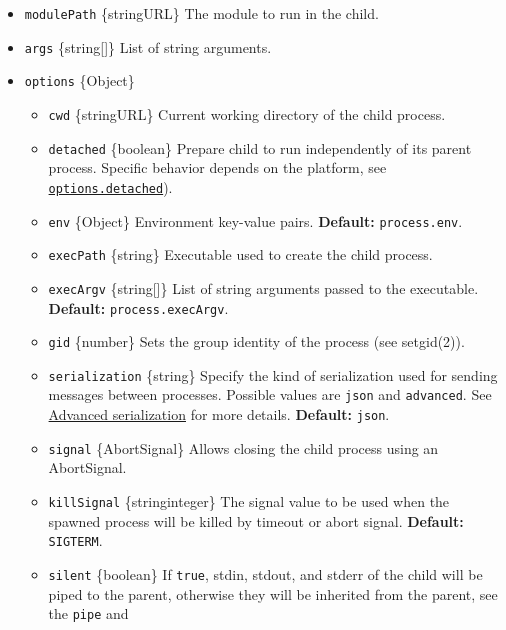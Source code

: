 \begin{itemize}
\tightlist
\item
  \texttt{modulePath} \{string\textbar URL\} The module to run in the
  child.
\item
  \texttt{args} \{string{[}{]}\} List of string arguments.
\item
  \texttt{options} \{Object\}

  \begin{itemize}
  \tightlist
  \item
    \texttt{cwd} \{string\textbar URL\} Current working directory of the
    child process.
  \item
    \texttt{detached} \{boolean\} Prepare child to run independently of
    its parent process. Specific behavior depends on the platform, see
    \hyperref[optionsdetached]{\texttt{options.detached}}).
  \item
    \texttt{env} \{Object\} Environment key-value pairs.
    \textbf{Default:} \texttt{process.env}.
  \item
    \texttt{execPath} \{string\} Executable used to create the child
    process.
  \item
    \texttt{execArgv} \{string{[}{]}\} List of string arguments passed
    to the executable. \textbf{Default:} \texttt{process.execArgv}.
  \item
    \texttt{gid} \{number\} Sets the group identity of the process (see
    setgid(2)).
  \item
    \texttt{serialization} \{string\} Specify the kind of serialization
    used for sending messages between processes. Possible values are
    \texttt{\textquotesingle{}json\textquotesingle{}} and
    \texttt{\textquotesingle{}advanced\textquotesingle{}}. See
    \hyperref[advanced-serialization]{Advanced serialization} for more
    details. \textbf{Default:}
    \texttt{\textquotesingle{}json\textquotesingle{}}.
  \item
    \texttt{signal} \{AbortSignal\} Allows closing the child process
    using an AbortSignal.
  \item
    \texttt{killSignal} \{string\textbar integer\} The signal value to
    be used when the spawned process will be killed by timeout or abort
    signal. \textbf{Default:}
    \texttt{\textquotesingle{}SIGTERM\textquotesingle{}}.
  \item
    \texttt{silent} \{boolean\} If \texttt{true}, stdin, stdout, and
    stderr of the child will be piped to the parent, otherwise they will
    be inherited from the parent, see the
    \texttt{\textquotesingle{}pipe\textquotesingle{}} and

\end{itemize}
\end{itemize}
